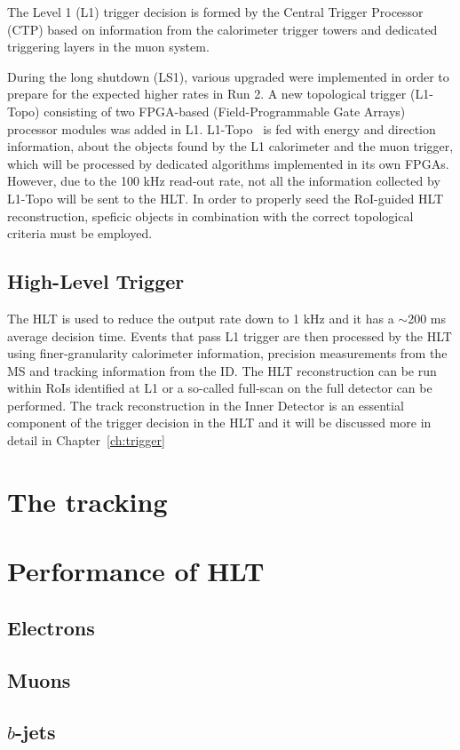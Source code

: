 			The Level 1 (L1) trigger decision is formed by the Central Trigger Processor (CTP) based on information from the calorimeter trigger towers and dedicated triggering layers in the muon system. 

			During the long shutdown (LS1), various upgraded were implemented in order to prepare for the expected higher rates in Run 2. A new topological trigger (L1-Topo) consisting of two FPGA-based (Field-Programmable Gate Arrays) processor modules was added in L1. L1-Topo~\cite{ATLASL1Topo} is fed with energy and direction information, about the objects found by the L1 calorimeter and the muon trigger, which will be processed by dedicated algorithms implemented in its own FPGAs. However, due to the 100 kHz read-out rate, not all the information collected by L1-Topo will be sent to the HLT. In order to properly seed the RoI-guided HLT reconstruction, speficic objects in combination with the correct topological criteria must be employed.


		\subsection{High-Level Trigger}
		\label{sec:HLT}

			The HLT is used to reduce the output rate down to 1 kHz and it has a $\sim$200 ms average decision time. Events that pass L1 trigger are then processed by the HLT using finer-granularity calorimeter information, precision measurements from the MS and tracking information from the ID. The HLT reconstruction can be run within RoIs identified at L1 or a so-called full-scan on the full detector can be performed. The track reconstruction in the Inner Detector is an essential component of the trigger decision in the HLT and it will be discussed more in detail in Chapter~\ref{ch:trigger}




	\section{The tracking}
	\label{sec:tracking}



	\section{Performance of HLT}
	\label{sec:Trig_perf}

		\subsection{Electrons}

		\subsection{Muons}

		\subsection{$b$-jets}

